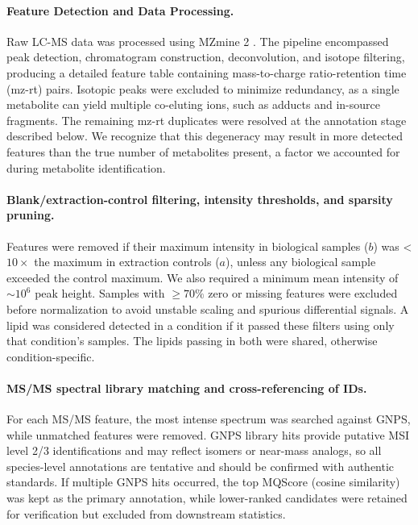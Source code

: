 \documentclass[9pt,twocolumn,twoside]{rilabRxiv}
\begin{document}
\paragraph{Feature Detection and Data Processing.}
Raw LC-MS data was processed using MZmine 2  \citep{Pluskal2010MZmine2}. The pipeline encompassed peak detection, chromatogram construction, deconvolution, and isotope filtering, producing a detailed feature table containing mass-to-charge ratio-retention time (mz-rt) pairs. Isotopic peaks were excluded to minimize redundancy, as a single metabolite can yield multiple co-eluting ions, such as adducts and in-source fragments. The remaining mz-rt duplicates were resolved at the annotation stage described below. We recognize that this degeneracy may result in more detected features than the true number of metabolites present, a factor we accounted for during metabolite identification.

\paragraph{Blank/extraction-control filtering, intensity thresholds, and sparsity pruning.}
Features were removed if their maximum intensity in biological samples ($b$) was < $10\times$ the maximum in extraction controls ($a$), unless any biological sample exceeded the control maximum. We also required a minimum mean intensity of $\sim 10^{6}$ peak height. Samples with $\geq 70\%$ zero or missing features were excluded before normalization to avoid unstable scaling and spurious differential signals. A lipid was considered detected in a condition if it passed these filters using only that condition’s samples. The lipids passing in both were shared, otherwise condition-specific.

\paragraph{MS/MS spectral library matching and cross-referencing of IDs.}
For each MS/MS feature, the most intense spectrum was searched against GNPS, while unmatched features were removed. GNPS library hits provide putative MSI level 2/3 identifications and may reflect isomers or near-mass analogs, so all species-level annotations are tentative and should be confirmed with authentic standards. If multiple GNPS hits occurred, the top MQScore (cosine similarity) was kept as the primary annotation, while lower-ranked candidates were retained for verification but excluded from downstream statistics.
\end{document}
